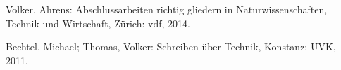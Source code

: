 \begin{thebibliography}{1}
	
	Volker, Ahrens: 
	Abschlussarbeiten richtig gliedern in Naturwissenschaften, Technik und Wirtschaft,
	Zürich: vdf, 
	2014.
	
	Bechtel, Michael; Thomas, Volker:
	Schreiben über Technik,
	Konstanz: UVK,
	2011.
	
\end{thebibliography}
\newpage
